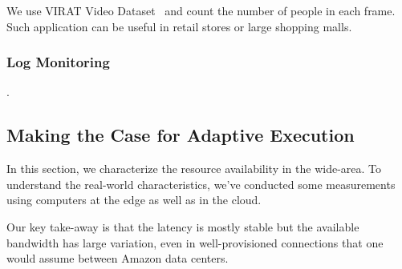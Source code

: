 We use VIRAT Video Dataset~\cite{oh2011large} and count the number of people in
each frame. Such application can be useful in retail stores or large shopping
malls.

\subsubsection{Log Monitoring}
\label{sec:log-monitoring}

.

\subsection{Making the Case for Adaptive Execution}
\label{sec:making-case-adapt}

In this section, we characterize the resource availability in the wide-area. To
understand the real-world characteristics, we've conducted some measurements
using computers at the edge as well as in the cloud.

Our key take-away is that the latency is mostly stable but the available
bandwidth has large variation, even in well-provisioned connections that one
would assume between Amazon data centers.

